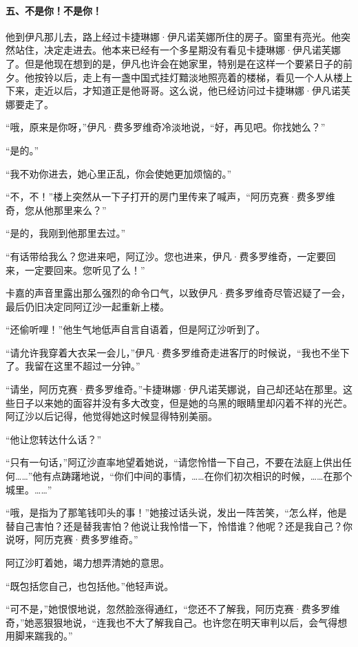 \paragraph*{五、不是你！不是你！}
\par 他到伊凡那儿去，路上经过卡捷琳娜·伊凡诺芙娜所住的房子。窗里有亮光。他突然站住，决定走进去。他本来已经有一个多星期没有看见卡捷琳娜·伊凡诺芙娜了。但是他现在想到的是，伊凡也许会在她家里，特别是在这样一个要紧日子的前夕。他按铃以后，走上有一盏中国式挂灯黯淡地照亮着的楼梯，看见一个人从楼上下来，走近以后，才知道正是他哥哥。这么说，他已经访问过卡捷琳娜·伊凡诺芙娜要走了。
\par “哦，原来是你呀，”伊凡·费多罗维奇冷淡地说，“好，再见吧。你找她么？”
\par “是的。”
\par “我不劝你进去，她心里正乱，你会使她更加烦恼的。”
\par “不，不！”楼上突然从一下子打开的房门里传来了喊声，“阿历克赛·费多罗维奇，您从他那里来么？”
\par “是的，我刚到他那里去过。”
\par “有话带给我么？您进来吧，阿辽沙。您也进来，伊凡·费多罗维奇，一定要回来，一定要回来。您听见了么！”
\par 卡嘉的声音里露出那么强烈的命令口气，以致伊凡·费多罗维奇尽管迟疑了一会，最后仍旧决定同阿辽沙一起重新上楼。
\par “还偷听哩！”他生气地低声自言自语着，但是阿辽沙听到了。
\par “请允许我穿着大衣呆一会儿，”伊凡·费多罗维奇走进客厅的时候说，“我也不坐下了。我留在这里不超过一分钟。”
\par “请坐，阿历克赛·费多罗维奇。”卡捷琳娜·伊凡诺芙娜说，自己却还站在那里。这些日子以来她的面容并没有多大改变，但是她的乌黑的眼睛里却闪着不祥的光芒。阿辽沙以后记得，他觉得她这时候显得特别美丽。
\par “他让您转达什么话？”
\par “只有一句话，”阿辽沙直率地望着她说，“请您怜惜一下自己，不要在法庭上供出任何……”他有点踌躇地说，“你们中间的事情，……在你们初次相识的时候，……在那个城里。……”
\par “哦，是指为了那笔钱叩头的事！”她接过话头说，发出一阵苦笑，“怎么样，他是替自己害怕？还是替我害怕？他说让我怜惜一下，怜惜谁？他呢？还是我自己？你说呀，阿历克赛·费多罗维奇。”
\par 阿辽沙盯着她，竭力想弄清她的意思。
\par “既包括您自己，也包括他。”他轻声说。
\par “可不是，”她恨恨地说，忽然脸涨得通红，“您还不了解我，阿历克赛·费多罗维奇，”她恶狠狠地说，“连我也不大了解我自己。也许您在明天审判以后，会气得想用脚来踹我的。”
